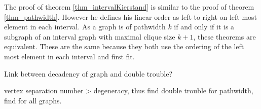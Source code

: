 The proof of theorem \ref{thm_intervalKierstand} is similar to the proof of theorem \ref{thm_pathwidth}. 
However he defines his linear order as left to right on left most element in each interval.  
As a graph is of pathwidth $k$ if and only if it is a subgraph of an interval graph with maximal clique size $k+1$, these theorems are equivalent. These are the same because they both use the ordering of the left most element in each interval and first fit.        


Link between decadency of graph and double trouble?

vertex separation number > degeneracy, thus find double trouble for pathwidth, find for all graphs. 
















